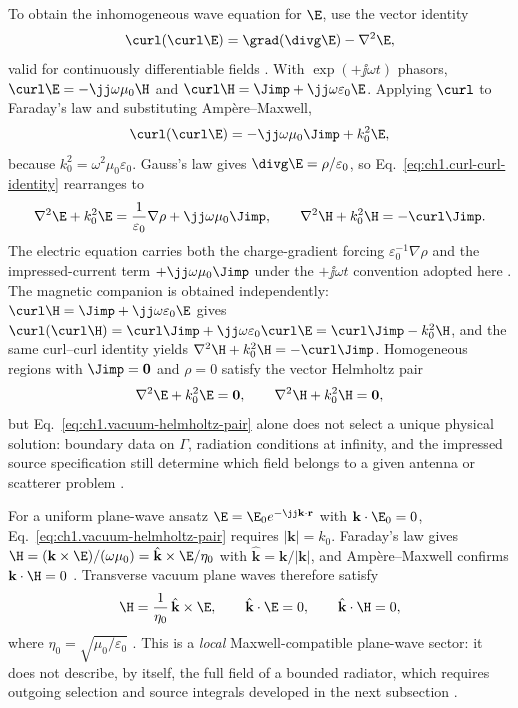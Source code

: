 To obtain the inhomogeneous wave equation for $\E$, use the vector identity
\begin{equation}
\label{eq:ch1.curl-curl-identity}
\curl(\curl\E)=\grad(\divg\E)-\nabla^2\E,
\end{equation}
valid for continuously differentiable fields \cite{stratton1941}. With $\exp(+\jj\omega t)$ phasors, $\curl\E=-\jj\omega\mu_0\H$ and $\curl\H=\Jimp+\jj\omega\varepsilon_0\E$. Applying $\curl$ to Faraday's law and substituting Amp\`ere--Maxwell,
\begin{equation}
\label{eq:ch1.wave-derivation-intermediate}
\curl(\curl\E)=-\jj\omega\mu_0\Jimp+k_0^2\E,
\end{equation}
because $k_0^2=\omega^2\mu_0\varepsilon_0$. Gauss's law gives $\divg\E=\rho/\varepsilon_0$, so Eq.~\eqref{eq:ch1.curl-curl-identity} rearranges to
\begin{equation}
\label{eq:ch1.vacuum-wave-source-driven}
\nabla^2\E+k_0^2\E=\frac{1}{\varepsilon_0}\nabla\rho+\jj\omega\mu_0\Jimp,\qquad
\nabla^2\H+k_0^2\H=-\curl\Jimp.
\end{equation}
The electric equation carries both the charge-gradient forcing $\varepsilon_0^{-1}\nabla\rho$ and the impressed-current term $+\jj\omega\mu_0\Jimp$ under the $+\jj\omega t$ convention adopted here \cite{jackson1999,stratton1941}. The magnetic companion is obtained independently: $\curl\H=\Jimp+\jj\omega\varepsilon_0\E$ gives $\curl(\curl\H)=\curl\Jimp+\jj\omega\varepsilon_0\curl\E=\curl\Jimp-k_0^2\H$, and the same curl--curl identity yields $\nabla^2\H+k_0^2\H=-\curl\Jimp$. Homogeneous regions with $\Jimp=\mathbf{0}$ and $\rho=0$ satisfy the vector Helmholtz pair
\begin{equation}
\label{eq:ch1.vacuum-helmholtz-pair}
\nabla^2\E+k_0^2\E=\mathbf{0},\qquad
\nabla^2\H+k_0^2\H=\mathbf{0},
\end{equation}
but Eq.~\eqref{eq:ch1.vacuum-helmholtz-pair} alone does not select a unique physical solution: boundary data on $\Gamma$, radiation conditions at infinity, and the impressed source specification still determine which field belongs to a given antenna or scatterer problem \cite{stratton1941}.

For a uniform plane-wave ansatz $\E=\E_0 e^{-\jj\mathbf{k}\cdot\mathbf{r}}$ with $\mathbf{k}\cdot\E_0=0$, Eq.~\eqref{eq:ch1.vacuum-helmholtz-pair} requires $|\mathbf{k}|=k_0$. Faraday's law gives $\H=(\mathbf{k}\times\E)/(\omega\mu_0)=\hat{\mathbf{k}}\times\E/\eta_0$ with $\hat{\mathbf{k}}=\mathbf{k}/|\mathbf{k}|$, and Amp\`ere--Maxwell confirms $\mathbf{k}\cdot\H=0$ \cite{stratton1941,jackson1999}. Transverse vacuum plane waves therefore satisfy
\begin{equation}
\label{eq:ch1.local-plane-wave-relations}
\H=\frac{1}{\eta_0}\,\hat{\mathbf{k}}\times\E,\qquad
\hat{\mathbf{k}}\cdot\E=0,\qquad
\hat{\mathbf{k}}\cdot\H=0,
\end{equation}
where $\eta_0=\sqrt{\mu_0/\varepsilon_0}$ \cite{stratton1941,jackson1999}. This is a \emph{local} Maxwell-compatible plane-wave sector: it does not describe, by itself, the full field of a bounded radiator, which requires outgoing selection and source integrals developed in the next subsection \cite{stratton1941}.

